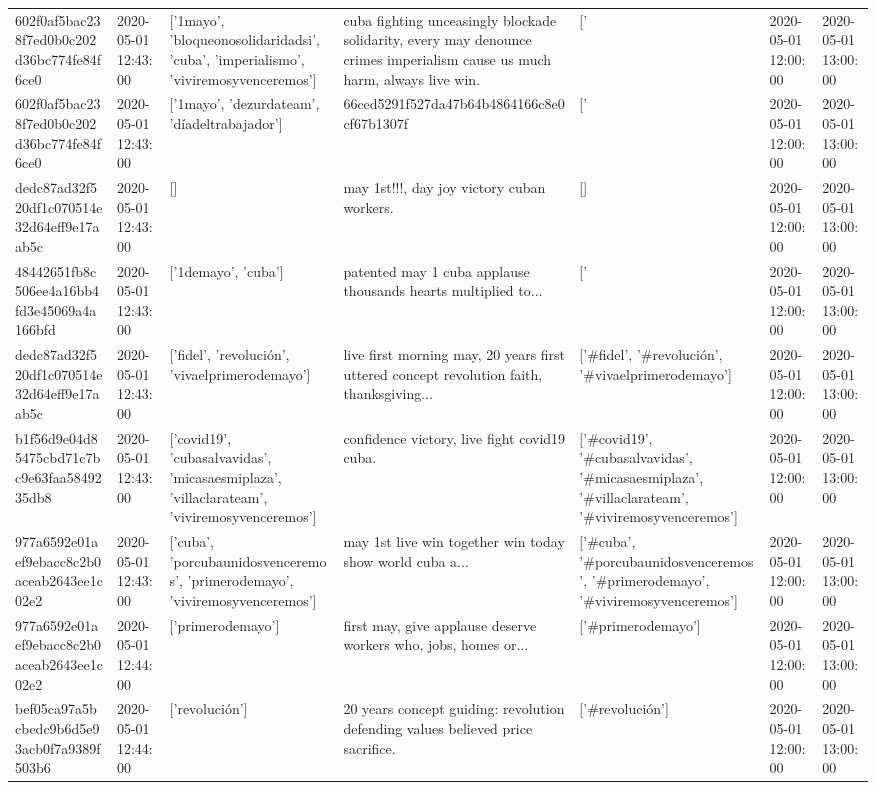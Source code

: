 \begin{tabular}{lllllll}
602f0af5bac238f7ed0b0c202d36bc774fe84f6ce0 & 2020-05-01 12:43:00 & ['1mayo', 'bloqueonosolidaridadsi', 'cuba', 'imperialismo', 'viviremosyvenceremos'] & cuba fighting unceasingly blockade solidarity, every may denounce crimes imperialism cause us much harm, always live win. & ['#1mayo', '#cuba', '#viviremosyvenceremos'] & 2020-05-01 12:00:00 & 2020-05-01 13:00:00 \\
602f0af5bac238f7ed0b0c202d36bc774fe84f6ce0 & 2020-05-01 12:43:00 & ['1mayo', 'dezurdateam', 'díadeltrabajador'] & 66ced5291f527da47b64b4864166c8e0cf67b1307f & ['#1mayo', '#dezurdateam', '#díadeltrabajador'] & 2020-05-01 12:00:00 & 2020-05-01 13:00:00 \\
dedc87ad32f520df1c070514e32d64eff9e17aab5c & 2020-05-01 12:43:00 & [] & may 1st!!!, day joy victory cuban workers. & [] & 2020-05-01 12:00:00 & 2020-05-01 13:00:00 \\
48442651fb8c506ee4a16bb4fd3e45069a4a166bfd & 2020-05-01 12:43:00 & ['1demayo', 'cuba'] & patented may 1 cuba applause thousands hearts multiplied to... & ['#1demayo', '#cuba'] & 2020-05-01 12:00:00 & 2020-05-01 13:00:00 \\
dedc87ad32f520df1c070514e32d64eff9e17aab5c & 2020-05-01 12:43:00 & ['fidel', 'revolución', 'vivaelprimerodemayo'] & live first morning may, 20 years first uttered concept revolution faith, thanksgiving... & ['#fidel', '#revolución', '#vivaelprimerodemayo'] & 2020-05-01 12:00:00 & 2020-05-01 13:00:00 \\
b1f56d9e04d85475cbd71c7bc9e63faa5849235db8 & 2020-05-01 12:43:00 & ['covid19', 'cubasalvavidas', 'micasaesmiplaza', 'villaclarateam', 'viviremosyvenceremos'] & confidence victory, live fight covid19 cuba. & ['#covid19', '#cubasalvavidas', '#micasaesmiplaza', '#villaclarateam', '#viviremosyvenceremos'] & 2020-05-01 12:00:00 & 2020-05-01 13:00:00 \\
977a6592e01aef9ebacc8c2b0aceab2643ee1c02e2 & 2020-05-01 12:43:00 & ['cuba', 'porcubaunidosvenceremos', 'primerodemayo', 'viviremosyvenceremos'] & may 1st live win together win today show world cuba a... & ['#cuba', '#porcubaunidosvenceremos', '#primerodemayo', '#viviremosyvenceremos'] & 2020-05-01 12:00:00 & 2020-05-01 13:00:00 \\
977a6592e01aef9ebacc8c2b0aceab2643ee1c02e2 & 2020-05-01 12:44:00 & ['primerodemayo'] & first may, give applause deserve workers who, jobs, homes or... & ['#primerodemayo'] & 2020-05-01 12:00:00 & 2020-05-01 13:00:00 \\
bef05ca97a5bcbedc9b6d5e93acb0f7a9389f503b6 & 2020-05-01 12:44:00 & ['revolución'] & 20 years concept guiding: revolution defending values believed price sacrifice. & ['#revolución'] & 2020-05-01 12:00:00 & 2020-05-01 13:00:00 \\

\end{tabular}
